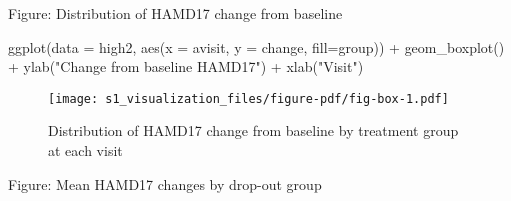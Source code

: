 \documentclass[
  letterpaper,
  DIV=11,
  numbers=noendperiod]{scrreprt}
\newenvironment{Shaded}{\begin{snugshade}}{\end{snugshade}}
\newcommand{\AttributeTok}[1]{\textcolor[rgb]{0.40,0.45,0.13}{#1}}
\newcommand{\FunctionTok}[1]{\textcolor[rgb]{0.28,0.35,0.67}{#1}}
\newcommand{\NormalTok}[1]{\textcolor[rgb]{0.00,0.23,0.31}{#1}}
\newcommand{\SpecialCharTok}[1]{\textcolor[rgb]{0.37,0.37,0.37}{#1}}
\newcommand{\StringTok}[1]{\textcolor[rgb]{0.13,0.47,0.30}{#1}}
\begin{document}
Figure: Distribution of HAMD17 change from baseline

\begin{Shaded}
\begin{Highlighting}[]
\FunctionTok{ggplot}\NormalTok{(}\AttributeTok{data =}\NormalTok{ high2, }\FunctionTok{aes}\NormalTok{(}\AttributeTok{x =}\NormalTok{ avisit, }\AttributeTok{y =}\NormalTok{ change, }\AttributeTok{fill=}\NormalTok{group)) }\SpecialCharTok{+} 
  \FunctionTok{geom\_boxplot}\NormalTok{() }\SpecialCharTok{+} \FunctionTok{ylab}\NormalTok{(}\StringTok{"Change from baseline HAMD17"}\NormalTok{) }\SpecialCharTok{+} \FunctionTok{xlab}\NormalTok{(}\StringTok{"Visit"}\NormalTok{)}
\end{Highlighting}
\end{Shaded}

\begin{figure}[H]

{\centering \texttt{[image: s1\_visualization\_files/figure-pdf/fig-box-1.pdf]}

}

\caption{\label{fig-box}Distribution of HAMD17 change from baseline by
treatment group at each visit}

\end{figure}

Figure: Mean HAMD17 changes by drop-out group
\end{document}
